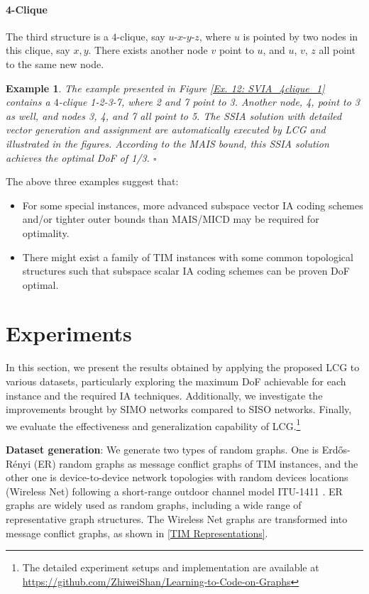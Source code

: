 \documentclass[a4paper,journal]{IEEEtran}
\newtheorem{exe}{Example}
\begin{document}
\paragraph{4-Clique}
The third structure is a $4$-clique, say $u$-$x$-$y$-$z$, where $u$ is pointed by two nodes in this clique, say $x, y$. There exists another node $v$ point to $u$, and $u$, $v$, $z$ all point to the same new node.
\begin{exe}\label{4clique_exe}
The example presented in Figure \ref{Ex. 12: SVIA_4clique_1} contains a $4$-clique 1-2-3-7, where 2 and 7 point to 3. Another node, 4, point to 3 as well, and nodes 3, 4, and 7 all point to 5. The SSIA solution with detailed vector generation and assignment are automatically executed by LCG and illustrated in the figures. According to the MAIS bound, this SSIA solution achieves the optimal DoF of 1/3.
\hfill $\square$
\end{exe}




The above three examples suggest that: 
\begin{itemize}
    \item [1)]
    For some special instances, more advanced subspace vector IA coding schemes and/or tighter outer bounds than MAIS/MICD may be required for optimality.
    \item [2)]
    There might exist a family of TIM instances with some common topological structures such that subspace scalar IA coding schemes can be proven DoF optimal.
\end{itemize}






\section{Experiments}
In this section, we present the results obtained by applying the proposed LCG to various datasets, particularly exploring the maximum DoF achievable for each instance and the required IA techniques. Additionally, we investigate the improvements brought by SIMO networks compared to SISO networks. Finally, we evaluate the effectiveness and generalization capability of LCG.\footnote{The detailed experiment setups and  implementation are available at \url{https://github.com/ZhiweiShan/Learning-to-Code-on-Graphs}}

\textbf{Dataset generation}:
{
We generate two types of random graphs. One is Erdős-Rényi (ER) random graphs \cite{batagelj2005efficient} as message conflict graphs of TIM instances, and the other one is device-to-device network topologies with random devices locations (Wireless Net) \cite{yi2015itlinq+} following a short-range outdoor channel model ITU-1411 \cite{ITU-R-P1411-8}. ER graphs are widely used as random graphs, including a wide range of representative graph structures. The Wireless Net graphs are transformed into message conflict graphs, as shown in \ref{TIM Representations}.}
\end{document}
